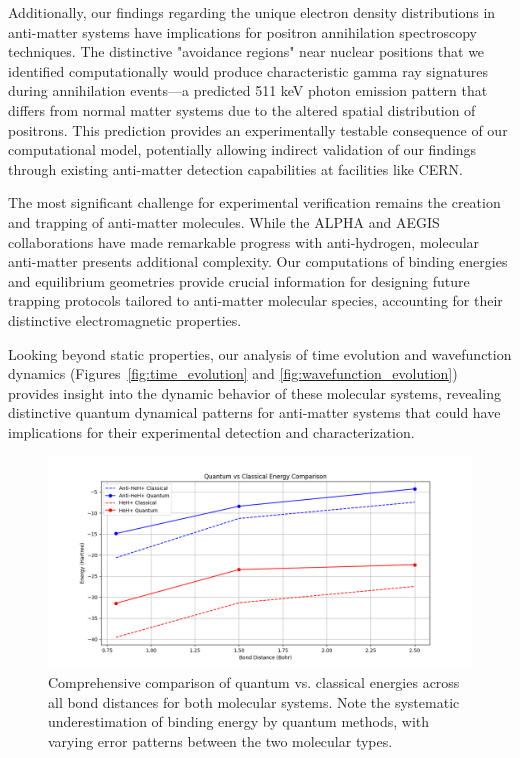 \documentclass[10pt,twocolumn,a4paper]{article}
\begin{document}
Additionally, our findings regarding the unique electron density distributions in anti-matter systems have implications for positron annihilation spectroscopy techniques. The distinctive "avoidance regions" near nuclear positions that we identified computationally would produce characteristic gamma ray signatures during annihilation events—a predicted 511 keV photon emission pattern that differs from normal matter systems due to the altered spatial distribution of positrons. This prediction provides an experimentally testable consequence of our computational model, potentially allowing indirect validation of our findings through existing anti-matter detection capabilities at facilities like CERN.

The most significant challenge for experimental verification remains the creation and trapping of anti-matter molecules. While the ALPHA and AEGIS collaborations have made remarkable progress with anti-hydrogen, molecular anti-matter presents additional complexity. Our computations of binding energies and equilibrium geometries provide crucial information for designing future trapping protocols tailored to anti-matter molecular species, accounting for their distinctive electromagnetic properties.

Looking beyond static properties, our analysis of time evolution and wavefunction dynamics (Figures~\ref{fig:time_evolution} and \ref{fig:wavefunction_evolution}) provides insight into the dynamic behavior of these molecular systems, revealing distinctive quantum dynamical patterns for anti-matter systems that could have implications for their experimental detection and characterization.

\begin{figure}[t!]
    \centering
    \includegraphics[width=\columnwidth]{graphs/quantum_vs_classical_energies.png}
    \caption{Comprehensive comparison of quantum vs. classical energies across all bond distances for both molecular systems. Note the systematic underestimation of binding energy by quantum methods, with varying error patterns between the two molecular types.}
    \label{fig:quantum_vs_classical}
\end{figure}
\end{document}
